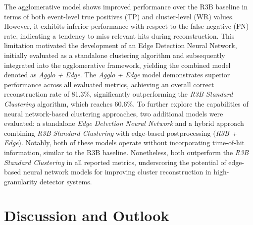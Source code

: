 \documentclass[final,5p,times,twocolumn]{elsarticle}
\begin{document}
The agglomerative model shows improved performance over the R3B baseline in terms of both event-level true positives (TP) and cluster-level (WR) values. However, it exhibits inferior performance with respect to the false negative (FN) rate, indicating a tendency to miss relevant hits during reconstruction. This limitation motivated the development of an Edge Detection Neural Network, initially evaluated as a standalone clustering algorithm and subsequently integrated into the agglomerative framework, yielding the combined model denoted as \textit{Agglo + Edge}.\newline
The \textit{Agglo + Edge} model demonstrates superior performance across all evaluated metrics, achieving an overall correct reconstruction rate of 81.3\%, significantly outperforming the \textit{R3B Standard Clustering} algorithm, which reaches 60.6\%.\newline
To further explore the capabilities of neural network-based clustering approaches, two additional models were evaluated: a standalone \textit{Edge Detection Neural Network} and a hybrid approach combining \textit{R3B Standard Clustering} with edge-based postprocessing (\textit{R3B + Edge}). Notably, both of these models operate without incorporating time-of-hit information, similar to the R3B baseline. Nonetheless, both outperform the \textit{R3B Standard Clustering} in all reported metrics, underscoring the potential of edge-based neural network models for improving cluster reconstruction in high-granularity detector systems.

\section{Discussion and Outlook}\label{sec:disc_outlook}
\end{document}
